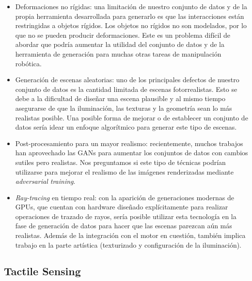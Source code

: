 \begin{itemize}
    \item Deformaciones no rígidas: una limitación de nuestro conjunto de datos y de la propia herramienta desarrollada para generarlo es que las interacciones están restringidas a objetos rígidos. Los objetos no rígidos no son modelados, por lo que no se pueden producir deformaciones. Este es un problema difícil de abordar que podría aumentar la utilidad del conjunto de datos y de la herramienta de generación para muchas otras tareas de manipulación robótica.
    \item Generación de escenas aleatorias: uno de los principales defectos de nuestro conjunto de datos es la cantidad limitada de escenas fotorrealistas. Esto se debe a la dificultad de diseñar una escena plausible y al mismo tiempo asegurarse de que la iluminación, las texturas y la geometría sean lo más realistas posible. Una posible forma de mejorar o de establecer un conjunto de datos sería idear un enfoque algorítmico para generar este tipo de escenas.
    \item Post-procesamiento para un mayor realismo: recientemente, muchos trabajos han aprovechado las \acp{GAN} para aumentar los conjuntos de datos con cambios sutiles pero realistas. Nos preguntamos si este tipo de técnicas podrían utilizarse para mejorar el realismo de las imágenes renderizadas mediante \emph{adversarial training}.
    \item \emph{Ray-tracing} en tiempo real: con la aparición de generaciones modernas de \acp{GPU}, que cuentan con hardware diseñado explícitamente para realizar operaciones de trazado de rayos, sería posible utilizar esta tecnología en la fase de generación de datos para hacer que las escenas parezcan aún más realistas. Además de la integración con el motor en cuestión, también implica trabajo en la parte artística (texturizado y configuración de la iluminación).
\end{itemize}

\subsection{Tactile Sensing}

